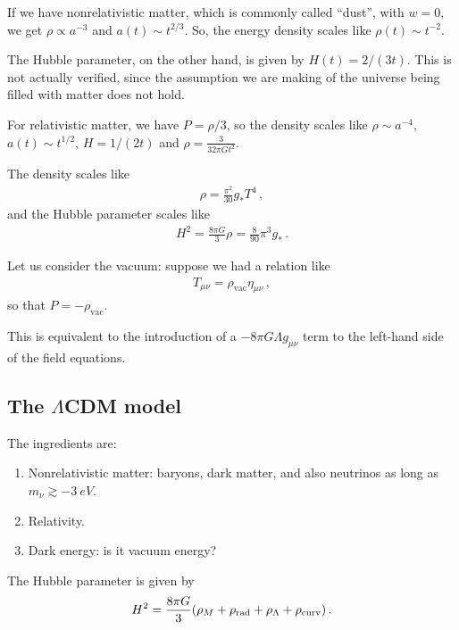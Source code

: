 \documentclass[main.tex]{subfiles}
\begin{document}
If we have nonrelativistic matter, which is commonly called ``dust'', with \(w = 0\), we get \(\rho \propto a^{-3}\) and \(a(t) \sim t^{2/3}\).
So, the energy density scales like \(\rho (t) \sim t^{-2}\). 

The Hubble parameter, on the other hand, is given by \(H(t) = 2 / (3 t)\). This is not actually verified, since the assumption we are making of the universe being filled with matter does not hold. 

For relativistic matter, we have \(P = \rho /3\), so the density scales like \(\rho \sim a^{-4}\), \(a(t) \sim t^{1/2}\), \(H = 1/(2t)\) and \(\rho = \frac{3}{32 \pi G t^2} \).

The density scales like 
%
\begin{align}
\rho = \frac{\pi^2}{30} g_{*} T^{4}
\,,
\end{align}
%
and the Hubble parameter scales like 
%
\begin{align}
H^2 = \frac{8\pi G}{3} \rho = \frac{8}{90} \pi^3 g_{*}
\,.
\end{align}

Let us consider the vacuum: suppose we had a relation like 
%
\begin{align}
T_{\mu \nu } = \rho _{\text{vac}} \eta_{\mu \nu }
\,,
\end{align}
%
so that \(P = - \rho _{\text{vac}}\).

This is equivalent to the introduction of a \(- 8 \pi G \Lambda g_{\mu \nu }\) term to the left-hand side of the field equations. 

\subsection{The \(\Lambda \)CDM model}

The ingredients are: 
\begin{enumerate}
    \item Nonrelativistic matter: baryons, dark matter, and also neutrinos as long as \(m_{\nu } \gtrsim \SI{-3}{eV}\). 
    \item Relativity.
    \item Dark energy: is it vacuum energy? 
\end{enumerate}

The Hubble parameter is given by 
%
\begin{align}
H^2 = \frac{8 \pi G}{3} \qty(\rho_{M} + \rho _{\text{rad}} + \rho_{\Lambda } + \rho _{\text{curv}})
\,.
\end{align}
\end{document}
